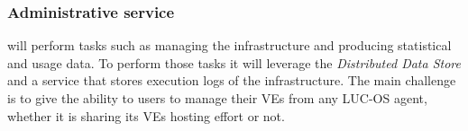 \subsubsection{Administrative service} 
will perform tasks such as managing the infrastructure and producing statistical
and usage data. To perform those tasks it will leverage the \emph{Distributed 
Data Store} and a service that stores execution logs of the infrastructure. The 
main challenge is to give the ability to users to manage their VEs from any 
LUC-OS agent, whether it is sharing its VEs hosting effort or not. 



